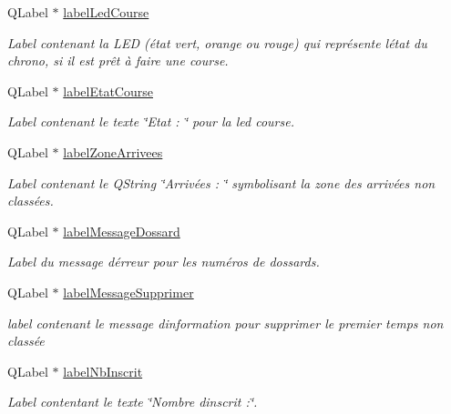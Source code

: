 \begin{DoxyCompactItemize}
Q\+Label $\ast$ \hyperlink{class_i_h_m_chrono_cross_a8568c80f2e2ffe96c81d2a94a2146159}{label\+Led\+Course}
\begin{DoxyCompactList}\small\item\em Label contenant la L\+ED (état vert, orange ou rouge) qui représente l\textquotesingle{}état du chrono, si il est prêt à faire une course. \end{DoxyCompactList}\item 
Q\+Label $\ast$ \hyperlink{class_i_h_m_chrono_cross_a433796aedfcc26313f639bd5157b1135}{label\+Etat\+Course}
\begin{DoxyCompactList}\small\item\em Label contenant le texte \char`\"{}\+Etat \+: \char`\"{} pour la led course. \end{DoxyCompactList}\item 
Q\+Label $\ast$ \hyperlink{class_i_h_m_chrono_cross_a56f6c02a8d3274c4359f12709cefa5d2}{label\+Zone\+Arrivees}
\begin{DoxyCompactList}\small\item\em Label contenant le Q\+String \char`\"{}\+Arrivées \+: \char`\"{} symbolisant la zone des arrivées non classées. \end{DoxyCompactList}\item 
Q\+Label $\ast$ \hyperlink{class_i_h_m_chrono_cross_abd23647486d38e6f57aef1faf50757af}{label\+Message\+Dossard}
\begin{DoxyCompactList}\small\item\em Label du message d\textquotesingle{}érreur pour les numéros de dossards. \end{DoxyCompactList}\item 
Q\+Label $\ast$ \hyperlink{class_i_h_m_chrono_cross_a6d818ff507406ebf299c571e0e5c1e49}{label\+Message\+Supprimer}
\begin{DoxyCompactList}\small\item\em label contenant le message d\textquotesingle{}information pour supprimer le premier temps non classée \end{DoxyCompactList}\item 
Q\+Label $\ast$ \hyperlink{class_i_h_m_chrono_cross_a9d410e8bc161481a83298176b2702519}{label\+Nb\+Inscrit}
\begin{DoxyCompactList}\small\item\em Label contentant le texte \char`\"{}\+Nombre d\textquotesingle{}inscrit \+:\char`\"{}. \end{DoxyCompactList}\item 

\end{DoxyCompactItemize}
